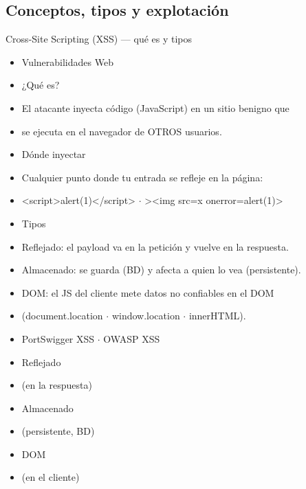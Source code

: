\documentclass[aspectratio=169,10pt]{beamer}
\begin{document}
\subsection{Conceptos, tipos y explotación}


\begin{frame}[allowframebreaks]{Cross-Site Scripting (XSS) --- qué es y tipos}
\small
  \begin{itemize}
  \item Vulnerabilidades Web
  \item ¿Qué es?
  \item El atacante inyecta código (JavaScript) en un sitio benigno que
  \item se ejecuta en el navegador de OTROS usuarios.
  \item Dónde inyectar
  \item Cualquier punto donde tu entrada se refleje en la página:
  \item \textless{}script\textgreater{}alert(1)\textless{}/script\textgreater{} $\cdot$ \textquotedbl{}\textgreater{}\textless{}img src=x onerror=alert(1)\textgreater{}
  \item Tipos
  \item Reflejado: el payload va en la petición y vuelve en la respuesta.
  \item Almacenado: se guarda (BD) y afecta a quien lo vea (persistente).
  \item DOM: el JS del cliente mete datos no confiables en el DOM
  \item (document.location $\cdot$ window.location $\cdot$ innerHTML).
  \item PortSwigger XSS $\cdot$ OWASP XSS
  \item Reflejado
  \item (en la respuesta)
  \item Almacenado
  \item (persistente, BD)
  \item DOM
  \item (en el cliente)
  \end{itemize}
\end{frame}
\end{document}
